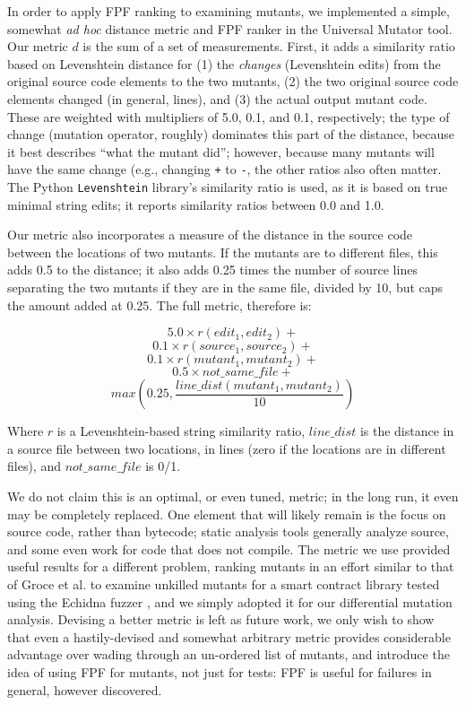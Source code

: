 In order to apply FPF ranking to examining mutants, we implemented a
simple, somewhat \emph{ad hoc} distance metric and FPF ranker in the
Universal Mutator \cite{universalmutator} tool.  Our metric $d$ is
the sum of a set of measurements.  First, it adds a similarity
ratio based on Levenshtein distance \cite{lev} for (1) the \emph{changes} (Levenshtein edits) from
the original source code elements to
the two mutants,  (2) the two original source code elements changed (in
general, lines), and (3) the actual output mutant code.  These are
weighted with multipliers of 5.0, 0.1, and 0.1, respectively; the type
of change (mutation operator, roughly) dominates this part of the
distance, because it best describes ``what the mutant did''; however,
because many mutants will have the same change (e.g., changing {\tt +}
to {\tt -}, the other ratios also often matter.  The Python
{\tt Levenshtein} library's similarity ratio is used, as it is based
on true minimal string edits; it reports similarity ratios between 0.0
and 1.0.

Our metric also incorporates a measure of the distance in the source
code between the locations of two mutants.  If the mutants are to
different files, this adds 0.5 to the distance; it also adds 0.25
times the number of source lines separating the two mutants if they
are in the same file, divided by 10, but caps the amount added at
0.25.  The full metric, therefore is:

$$ 5.0 \times r(\mathit{edit}_1, \mathit{edit}_2) +$$
$$0.1 \times r(\mathit{source}_1, \mathit{source}_2) +$$
$$0.1 \times r(\mathit{mutant}_1, \mathit{mutant}_2) +$$
$$0.5 \times \mathit{not\_same\_file} +$$
$$max(0.25, \frac{\mathit{line\_dist}(\mathit{mutant}_1, \mathit{mutant}_2)}{10})$$

\noindent Where $r$ is a Levenshtein-based string similarity ratio,
$\mathit{line\_dist}$ is the distance in a source file between
two locations, in lines (zero if the locations are in different
files), and $\mathit{not\_same\_file}$ is 0/1.

We do not claim this is an optimal, or even tuned, metric; in the long run, it even may be completely replaced.  One element that will likely remain is the focus on source code, rather than bytecode; static analysis tools generally analyze source, and some even work for code that does not compile.  The metric we use
provided useful results for a different problem, ranking mutants in an
effort similar to that of Groce et
al. \cite{groce2015verified,groce2018verified} to examine unkilled
mutants for a smart contract library tested using the Echidna fuzzer \cite{echidna-code},
and we simply adopted it for our differential mutation analysis.
Devising a better metric is left as future work, we only wish to show
that even a hastily-devised and somewhat arbitrary metric provides
considerable advantage over wading through an un-ordered list of
mutants, and introduce the idea of using FPF for mutants, not just for tests: FPF is useful for failures in general, however discovered.